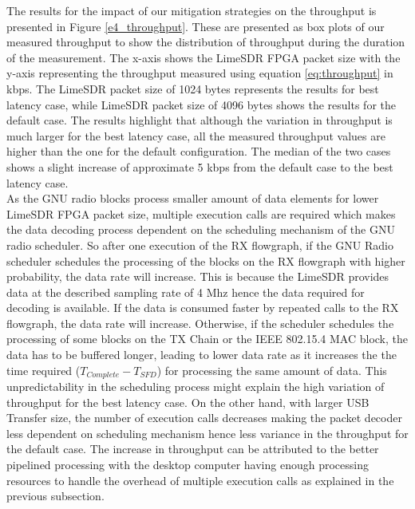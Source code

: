 The results for the  impact of our mitigation strategies on the throughput is presented in Figure \ref{e4_throughput}.
These are presented as box plots of our measured throughput to show the distribution of throughput during the duration of the measurement.
The x-axis shows the LimeSDR FPGA packet size with the y-axis representing the throughput measured using equation \ref{eq:throughput} in kbps.
The LimeSDR packet size of 1024 bytes represents the results for best latency case, while LimeSDR packet size of 4096 bytes shows the results for the default case.
The results highlight that although the variation in throughput is much larger for the best latency case, all the measured throughput values are higher than the one for the default configuration.
The median of the two cases shows a slight increase of approximate 5 kbps from the default case to the best latency case.\\

As the GNU radio blocks process smaller amount of data elements for lower LimeSDR FPGA packet size, multiple execution calls are required which makes the data decoding process dependent on the scheduling mechanism of the GNU radio scheduler. 
So after one execution of the RX flowgraph, if the GNU Radio scheduler schedules the processing of the blocks on the RX flowgraph with higher probability, the data rate will increase.
This is because the LimeSDR provides data at the described sampling rate of 4 Mhz hence the data required for decoding is available.
If the data is consumed faster by repeated calls to the RX flowgraph, the data rate will increase.
Otherwise, if the scheduler schedules the processing of some blocks on the TX Chain or the IEEE 802.15.4 MAC block, the data has to be buffered longer, leading to lower data rate as it increases the the time required ($T_{Complete}- T_{SFD}$) for processing the same amount of data. 
This unpredictability in the scheduling process might explain the high variation of throughput for the best latency case.
On the other hand, with larger USB Transfer size, the number of execution calls decreases making the packet decoder less dependent on scheduling mechanism hence less variance in the throughput for the default case.
The increase in throughput can be attributed to the better pipelined processing with the desktop computer having enough processing resources to handle the overhead of multiple execution calls as explained in the previous subsection.